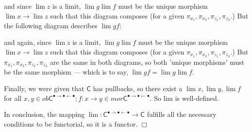 \documentclass[main.tex]{subfiles}
\begin{document}
	\noindent and since $ \lim z $ is a limit, $ \lim g \lim f $ must be the unique morphism $ \lim x \to \lim z $ such that this diagram composes (for a given $ \pi_{x_1}, \pi_{x_3}, \pi_{z_1}, \pi_{z_3}. $) But the following diagram describes $ \lim gf: $
	
	\begin{center}\end{center}

	\noindent and again, since $ \lim z $ is a limit, $ \lim g \lim f $ must be the unique morphism $ \lim x \to \lim z $ such that this diagram composes (for a given $ \pi_{x_1}, \pi_{x_3}, \pi_{z_1}, \pi_{z_3}. $) But $ \pi_{x_1}, \pi_{x_3}, \pi_{z_1}, \pi_{z_3} $ are the same in both diagrams, so both 'unique morphisms' must be the same morphism --- which is to say, $\lim gf = \lim g \lim f. $
	
	
	Finally, we were given that $ \mathsf{C} $ has pullbacks, so there exist a $ \lim x, \lim y, \lim f $ for all $ x, y \in ob \mathsf{C}^{\bullet\rightarrow\bullet\leftarrow\bullet}; f: x \to y \in mor \mathsf{C}^{\bullet\rightarrow\bullet\leftarrow\bullet}. $ So lim is well-defined. 
	
	In conclusion, the mapping $ \lim: \mathsf{C}^{\bullet\rightarrow\bullet\leftarrow\bullet} \to \mathsf{C} $ fulfills all the necessary conditions to be functorial, so it is a functor. $ \Box $



	
	
		
\end{document}
